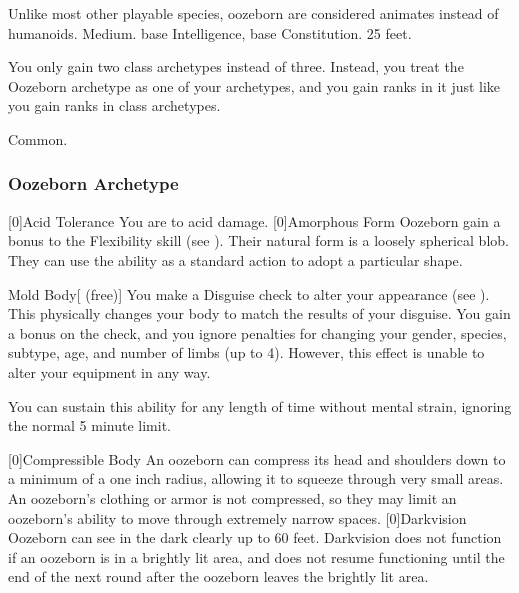          Unlike most other playable species, oozeborn are considered animates instead of humanoids.
         Medium.
          base Intelligence,  base Constitution.
         25 feet.
        \begin{itemize}
             You only gain two class archetypes instead of three.
                Instead, you treat the Oozeborn archetype as one of your archetypes, and you gain ranks in it just like you gain ranks in class archetypes.
        \end{itemize}
         Common.
        
        \subsubsection{Oozeborn Archetype}
            [0]{Acid Tolerance} You are  to acid damage.
            [0]{Amorphous Form} Oozeborn gain a  bonus to the Flexibility skill (see ).
                Their natural form is a loosely spherical blob.
                They can use the  ability as a standard action to adopt a particular shape.
                \begin{durationability}{Mold Body}[ (free)]
                    You make a Disguise check to alter your appearance (see ).
                    This physically changes your body to match the results of your disguise.
                    You gain a  bonus on the check, and you ignore penalties for changing your gender, species, subtype, age, and number of limbs (up to 4).
                    However, this effect is unable to alter your equipment in any way.

                    You can sustain this ability for any length of time without mental strain, ignoring the normal 5 minute limit.
                \end{durationability}
            [0]{Compressible Body} An oozeborn can compress its head and shoulders down to a minimum of a one inch radius, allowing it to squeeze through very small areas.
                An oozeborn's clothing or armor is not compressed, so they may limit an oozeborn's ability to move through extremely narrow spaces.
            [0]{Darkvision} Oozeborn can see in the dark clearly up to 60 feet.
                Darkvision does not function if an oozeborn is in a brightly lit area, and does not resume functioning until the end of the next round after the oozeborn leaves the brightly lit area.


